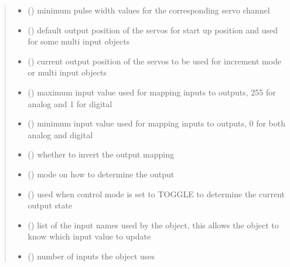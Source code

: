 \documentclass[letterpaper,10pt,english]{sphinxmanual}
\begin{document}
\begin{fulllineitems}
\begin{quote}
\begin{description}
\begin{itemize}
\item {} 
\sphinxAtStartPar
{}(\sphinxstyleemphasis{{[}int{]}}) \textendash{} minimum pulse width values 
for the corresponding servo channel

\item {} 
\sphinxAtStartPar
{}(\sphinxstyleemphasis{{[}int{]}}) \textendash{} default output position of 
the servos for start up position and used for some multi input 
objects

\item {} 
\sphinxAtStartPar
{}(\sphinxstyleemphasis{{[}int{]}}) \textendash{} current output position of the 
servos to be used for increment mode or multi input objects

\item {} 
\sphinxAtStartPar
{}() \textendash{} maximum input value used for mapping 
inputs to outputs, 255 for analog and 1 for digital

\item {} 
\sphinxAtStartPar
{}() \textendash{} minimum input value used for mapping 
inputs to outputs, 0 for both analog and digital

\item {} 
\sphinxAtStartPar
{}(\sphinxstyleemphasis{{[}Boolean{]}}) \textendash{} whether to invert the output 
mapping

\item {} 
\sphinxAtStartPar
{}() \textendash{} mode on how to determine 
the output

\item {} 
\sphinxAtStartPar
{}() \textendash{} used when control mode 
is set to TOGGLE to determine the current output state

\item {} 
\sphinxAtStartPar
{}(\sphinxstyleemphasis{{[}str{]}}) \textendash{} list of the input names used by 
the object, this allows the object to know which input value to 
update

\item {} 
\sphinxAtStartPar
{}() \textendash{} number of inputs the object uses


\end{itemize}
\end{description}
\end{quote}
\end{fulllineitems}
\end{document}
